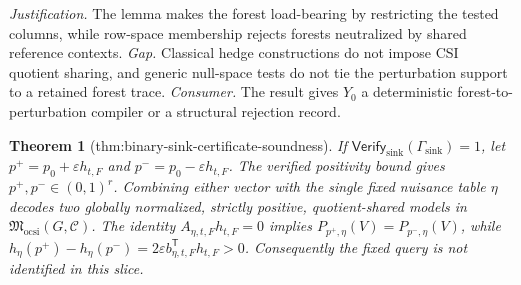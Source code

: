 \documentclass{article}
\newtheorem{theorem}{Theorem}
\begin{document}
\par\smallskip\noindent \textit{Justification.} The lemma makes the forest load-bearing by restricting the tested columns, while row-space membership rejects forests neutralized by shared reference contexts. \textit{Gap.} Classical hedge constructions do not impose CSI quotient sharing, and generic null-space tests do not tie the perturbation support to a retained forest trace. \textit{Consumer.} The result gives \(Y_0\) a deterministic forest-to-perturbation compiler or a structural rejection record.

\begin{theorem}[thm:binary-sink-certificate-soundness]\label{thm:binary-sink-certificate-soundness}
If \(\mathsf{Verify}_{\mathrm{sink}}(\Gamma_{\mathrm{sink}})=1\), let \(p^{+}=p_0+\varepsilon h_{t,F}\) and \(p^{-}=p_0-\varepsilon h_{t,F}\). The verified positivity bound gives \(p^{+},p^{-}\in(0,1)^r\). Combining either vector with the single fixed nuisance table \(\eta\) decodes two globally normalized, strictly positive, quotient-shared models in \(\mathfrak M_{\mathrm{ocsi}}(G,\mathcal C)\). The identity \(A_{\eta,t,F}h_{t,F}=0\) implies \(P_{p^{+},\eta}(V)=P_{p^{-},\eta}(V)\), while \(h_{\eta}(p^{+})-h_{\eta}(p^{-})=2\varepsilon b_{\eta,t,F}^{\mathsf T}h_{t,F}>0\). Consequently the fixed query is not identified in this slice.
\end{theorem}
\end{document}
